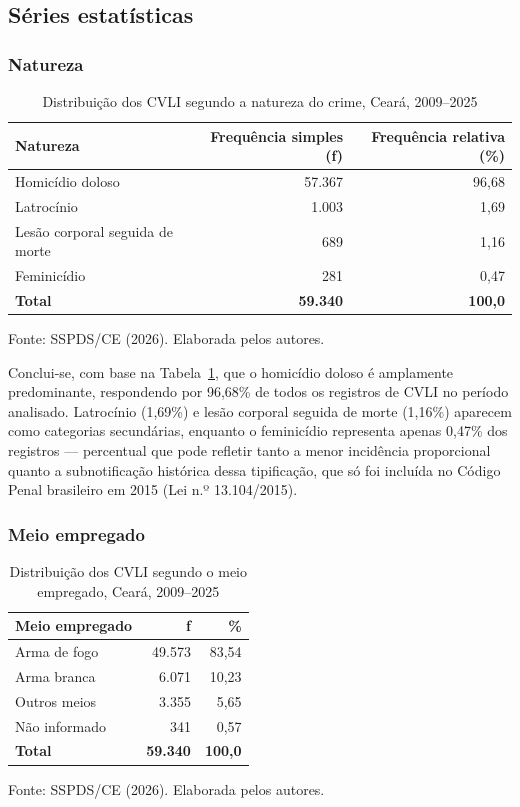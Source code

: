 \documentclass[12pt,a4paper]{article}
\newcommand{\fonte}[1]{  \vspace{-2mm}
  \begin{center}\footnotesize Fonte: #1\end{center}
}
\begin{document}
\subsection{Séries estatísticas}

\subsubsection{Natureza}

\begin{table}[H]
\centering
\caption{Distribuição dos CVLI segundo a natureza do crime, Ceará, 2009--2025}
\label{tab:natureza}
\begin{tabular}{lrr}
\toprule
\textbf{Natureza} & \textbf{Frequência simples (f)} & \textbf{Frequência relativa (\%)} \\
\midrule
Homicídio doloso                  & 57.367 & 96,68 \\
Latrocínio                        & 1.003  & 1,69  \\
Lesão corporal seguida de morte   & 689    & 1,16  \\
Feminicídio                       & 281    & 0,47  \\
\midrule
\textbf{Total}                    & \textbf{59.340} & \textbf{100,0} \\
\bottomrule
\end{tabular}
\end{table}
\fonte{SSPDS/CE (2026). Elaborada pelos autores.}

Conclui-se, com base na Tabela~\ref{tab:natureza}, que o homicídio doloso é amplamente predominante, respondendo por 96,68\% de todos os registros de CVLI no período analisado. Latrocínio (1,69\%) e lesão corporal seguida de morte (1,16\%) aparecem como categorias secundárias, enquanto o feminicídio representa apenas 0,47\% dos registros --- percentual que pode refletir tanto a menor incidência proporcional quanto a subnotificação histórica dessa tipificação, que só foi incluída no Código Penal brasileiro em 2015 (Lei n.º 13.104/2015).

\subsubsection{Meio empregado}

\begin{table}[H]
\centering
\caption{Distribuição dos CVLI segundo o meio empregado, Ceará, 2009--2025}
\label{tab:meio}
\begin{tabular}{lrr}
\toprule
\textbf{Meio empregado} & \textbf{f} & \textbf{\%} \\
\midrule
Arma de fogo    & 49.573 & 83,54 \\
Arma branca     & 6.071  & 10,23 \\
Outros meios    & 3.355  & 5,65  \\
Não informado   & 341    & 0,57  \\
\midrule
\textbf{Total}  & \textbf{59.340} & \textbf{100,0} \\
\bottomrule
\end{tabular}
\end{table}
\fonte{SSPDS/CE (2026). Elaborada pelos autores.}
\end{document}
